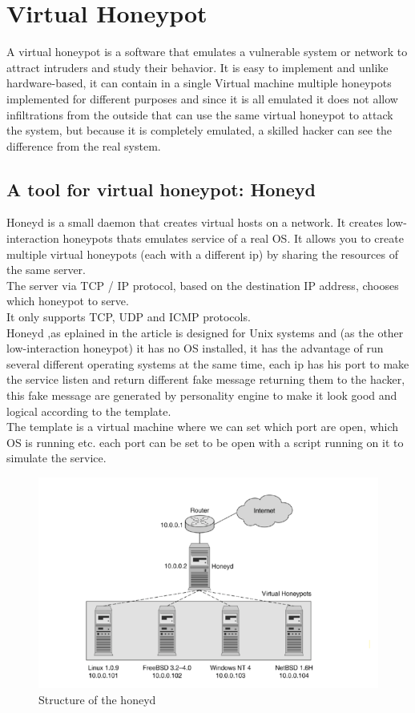 \section{Virtual Honeypot}
A virtual honeypot is a software that emulates a vulnerable system or network to attract intruders and study their behavior. It is easy to implement and unlike hardware-based, it can contain in a single Virtual machine  multiple honeypots implemented for different purposes and since it is all emulated it does not allow infiltrations from the outside that can use the same virtual honeypot to attack the system, but  because it is completely emulated, a skilled hacker can see the difference from the real system.
\subsection{A tool for virtual honeypot: Honeyd}
Honeyd is a small daemon that creates virtual hosts on a network. It creates low-interaction honeypots thats emulates service of a real OS.
It allows you to create multiple virtual honeypots (each with a different ip) by sharing the resources of the same server.\\
The server via TCP / IP protocol, based on the destination IP address, chooses which honeypot to serve.\\
It only supports TCP, UDP and ICMP protocols.\\
Honeyd ,as eplained in the article \cite{Provos2003HoneydA} is designed for Unix systems and (as the other low-interaction honeypot) it has no OS installed, it has the advantage of run several different operating systems at the same time, each ip has his port to make the service listen and return different fake message returning them to the hacker, this fake message are generated by personality engine to make it look good and logical according to the template.\\
The template is a virtual machine where we can set which port are open, which OS is running etc. each port can be set to be open with a script running on it to simulate the service.\\
\begin{figure}[h!]
  \centering
  \includegraphics{images/honeyd1.png}
  \caption{Structure of the honeyd}
  \label{fig:irradiances}
\end{figure}
